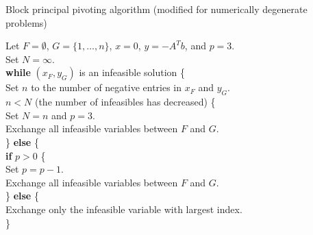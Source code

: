 \documentclass[acmtoms,acmnow,aps,floatfix]{acmtrans2m}
\begin{document}
\begin{center}
Block principal pivoting algorithm (modified for numerically degenerate problems)\\
\bigskip

\begin{minipage}{6.5in}
\begin{tabbing}
Let $F = \emptyset$, $G = \{1, \dots, n\}$, $x = 0$, $y = -A^T b$, and $p = 3$. \\
Set $N = \infty$.\\
{\bf while} $(x_F,y_G)$ is an infeasible solution \{ \\
\hspace*{1em}Set $n$ to the number of negative entries in $x_F$ and $y_G$.\\
\hspace*{1em}{\bf if} $n < N$ (the number of infeasibles has decreased) \{ \\
\hspace*{1em}\hspace*{1em}Set $N = n$ and $p = 3$.\\
\hspace*{1em}\hspace*{1em}Exchange all infeasible variables between $F$ and $G$.\\
\hspace*{1em}\} {\bf else} \{\\
\hspace*{1em}\hspace*{1em} {\bf if} $p > 0$ \{ \\
\hspace*{1em}\hspace*{1em}\hspace*{1em}Set $p = p - 1$.\\
\hspace*{1em}\hspace*{1em}\hspace*{1em}Exchange all infeasible variables between $F$ and $G$.\\
\hspace*{1em}\hspace*{1em}\} {\bf else} \{ \\
\hspace*{1em}\hspace*{1em}\hspace*{1em}Exchange only the infeasible variable with largest index.\\
\hspace*{1em}\hspace*{1em}\} \\

\end{tabbing}
\end{minipage}
\end{center}
\end{document}
